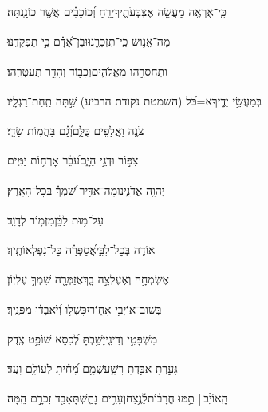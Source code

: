 \documentclass[12pt]{article}
\newcommand{\loc}[1]{\textsuperscript{\locf{#1}}}
\begin{document}
{\loc{ ד}~}‏כִּֽי־אֶרְאֶ֣ה  מַעֲשֵׂ֣ה אֶצְבְּעֹתֶ֑יךָ{\hfill}יָרֵ֥חַ וְ֝כוֹכָבִ֗ים אֲשֶׁ֣ר כּוֹנָֽנְתָּה׃\par

{\loc{ ה}~}‏מָה־אֱנ֥וֹשׁ כִּֽי־תִזְכְּרֶ֑נּוּ{\hfill}וּבֶן־אָ֝דָ֗ם כִּ֣י תִפְקְדֶֽנּוּ׃\par

{\loc{ ו}~}‏וַתְּחַסְּרֵ֣הוּ  מֵאֱלֹהִ֑ים{\hfill}וְכָב֖וֹד וְהָדָ֣ר תְּעַטְּרֵֽהוּ׃\par

{\loc{ ז}~}‏ בְּמַעֲשֵׂ֣י יָדֶ֑יךָ{\hfill}א=כֹּ֝ל (השמטת נקודת הרביע) שַׁ֣תָּה תַֽחַת־רַגְלָֽיו׃\par

{\loc{ ח}~}‏צֹנֶ֣ה וַאֲלָפִ֣ים כֻּלָּ֑ם{\hfill}וְ֝גַ֗ם בַּהֲמ֥וֹת שָׂדָֽי׃\par

{\loc{ ט}~}‏צִפּ֣וֹר  וּדְגֵ֣י הַיָּ֑ם{\hfill}עֹ֝בֵ֗ר אׇרְח֥וֹת יַמִּֽים׃\par

{\loc{ י}~}‏יְהֹוָ֥ה אֲדֹנֵ֑ינוּ{\hfill}מָה־אַדִּ֥יר שִׁ֝מְךָ֗ בְּכׇל־הָאָֽרֶץ׃\par\pend
\ledpb
\pstart[\subsection*{\textcolor{red}{פרק ט}}]\label{פרק ט}
{\loc{ א}~}‏ עַל־מ֥וּת לַבֵּ֗ן{\hfill}מִזְמ֥וֹר לְדָוִֽד׃\par

{\loc{ ב}~}‏אוֹדֶ֣ה  בְּכׇל־לִבִּ֑י{\hfill}אֲ֝סַפְּרָ֗ה כׇּל־נִפְלְאוֹתֶֽיךָ׃\par

{\loc{ ג}~}‏אֶשְׂמְחָ֣ה וְאֶעֶלְצָ֣ה בָ֑ךְ{\hfill}אֲזַמְּרָ֖ה שִׁמְךָ֣ עֶלְיֽוֹן׃\par

{\loc{ ד}~}‏בְּשׁוּב־אוֹיְבַ֥י אָח֑וֹר{\hfill}יִכָּשְׁל֥וּ וְ֝יֹאבְד֗וּ מִפָּנֶֽיךָ׃\par

{\loc{ ה}~}‏ מִשְׁפָּטִ֣י וְדִינִ֑י{\hfill}יָשַׁ֥בְתָּ לְ֝כִסֵּ֗א שׁוֹפֵ֥ט צֶֽדֶק׃\par

{\loc{ ו}~}‏גָּעַ֣רְתָּ  אִבַּ֣דְתָּ רָשָׁ֑ע{\hfill}שְׁמָ֥ם מָ֝חִ֗יתָ לְעוֹלָ֥ם וָעֶֽד׃\par

{\loc{ ז}~}‏הָֽאוֹיֵ֨ב |  תַּ֥מּוּ חֳרָב֗וֹת{\hfill}לָ֫נֶ֥צַח\newline\hspace*{.5em}וְעָרִ֥ים נָתַ֑שְׁתָּ{\hfill}אָבַ֖ד זִכְרָ֣ם הֵֽמָּה׃\par
\end{document}
